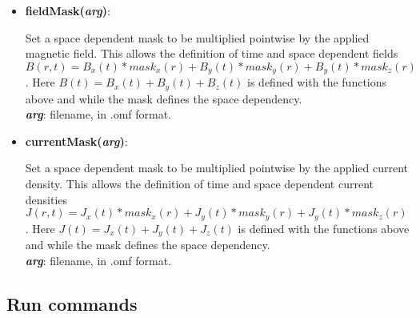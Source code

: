 \begin{itemize}
 \item {\vspace{-0.4cm}\textbf{fieldMask(\textit{arg})}:
				\flushright\parbox{0.9 \textwidth}{\vspace{-0.25cm} 
				Set a space dependent mask to be multiplied pointwise by the applied magnetic field.  This allows the definition of time and space dependent fields $B(r,t) = B_x(t)*mask_x(r) + B_y(t)*mask_y(r) + B_y(t)*mask_z(r)$.  Here $B(t)= B_x(t) + B_y(t) + B_z(t)$ is defined with the functions above and while the mask defines the space dependency.\\
				\textbf{\textit{arg}}: filename, in .omf format.
				}\flushleft}

 \item {\vspace{-0.4cm}\textbf{currentMask(\textit{arg})}:
				\flushright\parbox{0.9 \textwidth}{\vspace{-0.25cm} 
				Set a space dependent mask to be multiplied pointwise by the applied current density.  This allows the definition of time and space dependent current densities $J(r,t) = J_x(t)*mask_x(r) + J_y(t)*mask_y(r) + J_y(t)*mask_z(r)$.  Here $J(t)= J_x(t) + J_y(t) + J_z(t)$ is defined with the functions above and while the mask defines the space dependency.\\
				\textbf{\textit{arg}}: filename, in .omf format.
				}\flushleft}

\end{itemize}



\subsection{Run commands}


